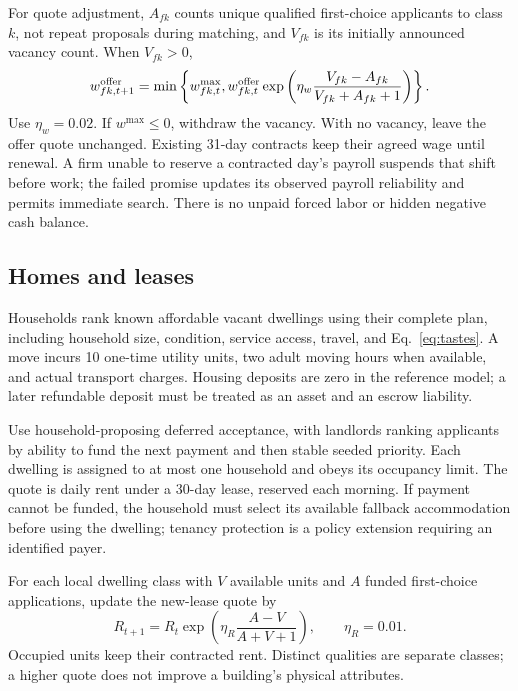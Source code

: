 \documentclass[10pt,a4paper,twocolumn]{article}
\begin{document}
For quote adjustment, $A_{fk}$ counts unique qualified first-choice
applicants to class $k$, not repeat proposals during matching, and
$V_{fk}$ is its initially announced vacancy count. When $V_{fk}>0$,
\begin{equation}
 w^{\rm offer}_{fk,t+1}=\min\left\{w^{\max}_{fk,t},
 w^{\rm offer}_{fk,t}
 \exp\left(\eta_w\frac{V_{fk}-A_{fk}}{V_{fk}+A_{fk}+1}\right)
 \right\}.
 \label{eq:wage}
\end{equation}
Use $\eta_w=0.02$. If $w^{\max}\leq0$, withdraw the vacancy. With no
vacancy, leave the offer quote unchanged. Existing 31-day contracts keep
their agreed wage until renewal. A firm unable to reserve a contracted
day's payroll suspends that shift before work; the failed promise updates
its observed payroll reliability and permits immediate search. There is
no unpaid forced labor or hidden negative cash balance.

\subsection{Homes and leases}
Households rank known affordable vacant dwellings using their complete
plan, including household size, condition, service access, travel, and
Eq.~\eqref{eq:tastes}. A move incurs 10 one-time utility units, two adult
moving hours when available, and actual transport charges. Housing
deposits are zero in the reference model; a later refundable deposit
must be treated as an asset and an escrow liability.

Use household-proposing deferred acceptance, with landlords ranking
applicants by ability to fund the next payment and then stable seeded
priority. Each dwelling is assigned to at most one household and obeys
its occupancy limit. The quote is daily rent under a 30-day lease,
reserved each morning. If payment cannot be funded, the household must
select its available fallback accommodation before using the dwelling;
tenancy protection is a policy extension requiring an identified payer.

For each local dwelling class with $V$ available units and $A$ funded
first-choice applications, update the new-lease quote by
\begin{equation}
 R_{t+1}=R_t\exp\left(\eta_R\frac{A-V}{A+V+1}\right),
 \qquad \eta_R=0.01.
\end{equation}
Occupied units keep their contracted rent. Distinct qualities are
separate classes; a higher quote does not improve a building's physical
attributes.
\end{document}
